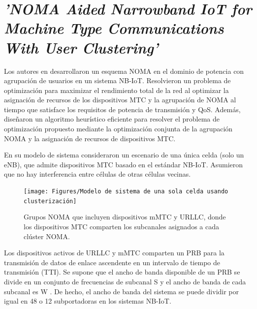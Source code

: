 
\section{\textit{'NOMA Aided Narrowband IoT for Machine Type Communications With User Clustering'}}

Los autores en \parencite{Shahini2019} desarrollaron un esquema NOMA en el dominio de potencia con agrupación de usuarios en un sistema NB-IoT. Resolvieron un problema de optimización para maximizar el rendimiento total de la red al optimizar la asignación de recursos de los dispositivos MTC y la agrupación de NOMA al tiempo que satisface los requisitos de potencia de transmisión y QoS.  Además, diseñaron un algoritmo heurístico eficiente para resolver el problema de optimización propuesto mediante la optimización conjunta de la agrupación NOMA y la asignación de recursos de dispositivos MTC.\newline

En su modelo de sistema consideraron un escenario de una única celda (solo un eNB), que admite dispositivos MTC basado en el estándar NB-IoT. Asumieron que no hay interferencia entre células de otras células vecinas. \newline

\begin{figure}[th]
\centering
\texttt{[image: Figures/Modelo de sistema de una sola celda usando clusterización]}
\decoRule
\caption[Grupos NOMA que incluyen dispositivos mMTC y URLLC, donde los dispositivos MTC comparten los subcanales asignados a cada clúster NOMA.]{Grupos NOMA que incluyen dispositivos mMTC y URLLC, donde los dispositivos MTC comparten los subcanales asignados a cada clúster NOMA.}
\label{fig:NOMA_NBIOT}
\end{figure}

Los dispositivos activos de URLLC y mMTC comparten un PRB para la transmisión de datos de enlace ascendente en un intervalo de tiempo de transmisión (TTI). Se supone que el ancho de banda disponible de un PRB se divide en un conjunto de frecuencias de subcanal S y el ancho de banda de cada subcanal es W . De hecho, el ancho de banda del sistema se puede dividir por igual en 48 o 12 subportadoras en los sistemas NB-IoT.\newline


